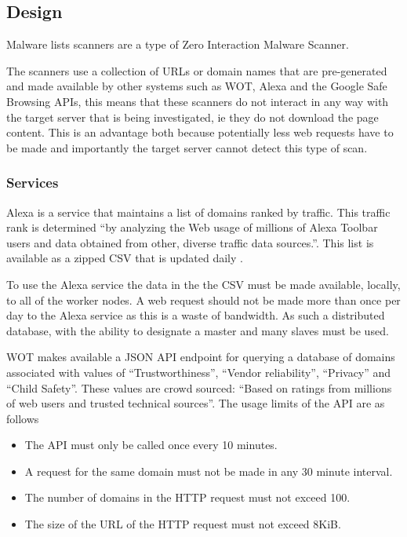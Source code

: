 \subsection{Design}
Malware lists scanners are a type of Zero Interaction Malware Scanner.

The scanners use a collection of URLs or domain names that are pre-generated and made available by other systems such as WOT, Alexa and the Google Safe Browsing APIs, this means that these scanners do not interact in any way with the target server that is being investigated, ie they do not download the page content. This is an advantage both because potentially less web requests have to be made and importantly the target server cannot detect this type of scan.


\subsubsection{Services}
Alexa is a service that maintains a list of domains ranked by traffic. This traffic rank is determined ``by analyzing the Web usage of millions of Alexa Toolbar users and data obtained from other, diverse traffic data sources.''\cite{alexa-about}. This list is available as a zipped CSV that is updated daily \cite{alexa-site-archive}.

To use the Alexa service the data in the the CSV must be made available, locally, to all of the worker nodes. A web request should not be made more than once per day to the Alexa service as this is a waste of bandwidth. As such a distributed database, with the ability to designate a master and many slaves must be used.

WOT makes available a JSON API endpoint for querying a database of domains associated with values of ``Trustworthiness'', ``Vendor reliability'', ``Privacy'' and ``Child Safety''. These values are crowd sourced: ``Based on ratings from millions of web users and trusted technical sources''\cite{wot-about}.  The usage limits of the API are as follows

\begin{itemize}
    \item The API must only be called once every 10 minutes.
    \item A request for the same domain must not be made in any 30 minute interval.
    \item The number of domains in the HTTP request must not exceed 100.
    \item The size of the URL of the HTTP request must not exceed 8KiB.
\end{itemize}

